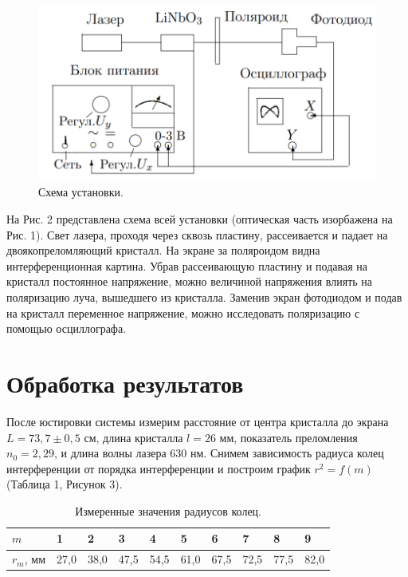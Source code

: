 \documentclass[a4paper,12pt]{article}
\begin{document}
\begin{figure}[h!]
	\begin{center}
		\includegraphics[scale = 0.5]{2.png}
	\end{center}
	\caption{Схема установки.}
\end{figure}
На Рис. 2 представлена схема всей установки (оптическая часть изорбажена на Рис. 1). Свет лазера, проходя через сквозь пластину, рассеивается и падает на двоякопреломляющий кристалл. На экране за поляроидом видна интерференционная картина. Убрав рассеивающую пластину и подавая на кристалл постоянное напряжение, можно величиной напряжения влиять на поляризацию луча, вышедшего из кристалла. Заменив экран фотодиодом и подав на кристалл переменное напряжение, можно исследовать поляризацию с помощью осциллографа.

	\section{Обработка результатов}
	После юстировки системы измерим расстояние от центра кристалла до экрана $L = 73,7\pm0,5$ см, длина кристалла $l = 26$ мм, показатель преломления $n_0 = 2,29$, и длина волны лазера $630$ нм. Снимем зависимость радиуса колец интерференции от порядка интерференции и построим график $r^2 = f(m)$ (Таблица 1, Рисунок 3).
	\begin{table}[h!]
		\centering
		\begin{tabular}{|l|l|l|l|l|l|l|l|l|l|}
			\hline
			$m$       & 1    & 2    & 3    & 4    & 5    & 6    & 7    & 8    & 9    \\ \hline
			$r_m$, мм & 27,0 & 38,0 & 47,5 & 54,5 & 61,0 & 67,5 & 72,5 & 77,5 & 82,0 \\ \hline
		\end{tabular}
        \label{table_v3}
        \caption{ Измеренные значения радиусов колец.}
	\end{table}
\end{document}
